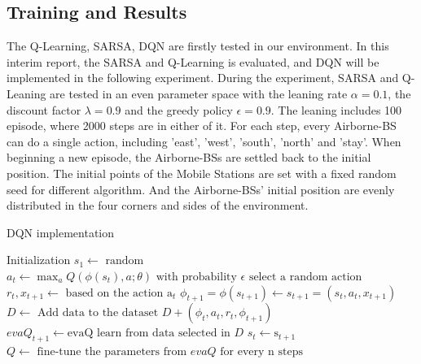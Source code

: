 \documentclass[
12pt, %
a4paper, %
oneside, %
headinclude,footinclude, %
BCOR5mm, %
]{scrartcl}
\begin{document}
\subsection{Training and Results}
\noindent The Q-Learning, SARSA, DQN are firstly tested in our environment. In this interim report, the SARSA and Q-Learning is evaluated, and DQN will be implemented in the following experiment. During the experiment, SARSA and Q-Leaning are tested in an even parameter space with the leaning rate $\alpha = 0.1$, the discount factor $\lambda=0.9$ and the greedy policy $\epsilon=0.9$. The leaning includes 100 episode, where 2000 steps are in either of it. For each step, every Airborne-BS can do a single action, including 'east', 'west', 'south', 'north' and 'stay'. When beginning a new episode, the Airborne-BSs are settled back to the initial position. The initial points of the Mobile Stations are set with a fixed random seed for different algorithm. And the Airborne-BSs' initial position are evenly distributed in the four corners and sides of the environment. \\

\begin{algorithm}
	\caption{DQN implementation}
	\label{alg2}
	\begin{algorithmic}[1]
		\STATE Initialization
    \STATE $s_{1} \leftarrow \text { random }$
    \STATE $ a_{t}\leftarrow \max _{a} Q\left(\phi\left(s_{t}\right), a ; \theta\right)\text { with probability } \epsilon \text { select a random action } $
    \STATE $ r_{t}, x_{t+1} \leftarrow \text { based on the action } \mathrm{a}_{t}$
		\STATE $\phi_{t+1}=\phi\left(s_{t+1}\right)\leftarrow s_{t+1}=\left(s_{t}, a_{t}, x_{t+1}\right)$
		\STATE $D \leftarrow \text { Add data to the dataset } D+\left(\phi_{t}, a_{t}, r_{t}, \phi_{t+1}\right)$
    \STATE $ eva Q_{t+1} \leftarrow \text {evaQ learn from data selected in } D$
    \STATE $s_{t} \leftarrow \mathrm{s}_{t+1} $
    \ENDFOR
		\STATE $ Q \leftarrow \text{ fine-tune the parameters from }  evaQ \text{ for every n steps} $
		\ENDFOR
		\ENDFOR
	\end{algorithmic}
\end{algorithm}







%
%
\end{document}

